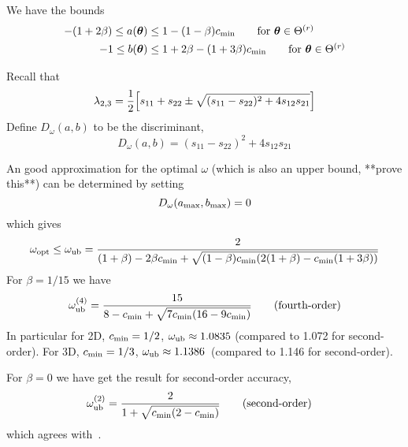 \documentclass[12pt]{article}
\begin{document}
We have the bounds
\begin{align*}
-(1+2\beta) \le a(\boldsymbol{\theta}) &\le 1 - (1-\beta)c_{\rm min}  \qquad\mbox{for $\boldsymbol{\theta}\in\Theta^{(r)}$} \\
-1 \le b(\boldsymbol{\theta}) &\le 1+2\beta - (1+3\beta)c_{\rm min}  \qquad\mbox{for $\boldsymbol{\theta}\in\Theta^{(r)}$} 
\end{align*}

Recall that 
\[
  \lambda_{2,3} = {1\over 2}\Big[ s_{11}+s_{22} \pm \sqrt{ (s_{11}-s_{22})^2 + 4 s_{12}s_{21} } \Big]
\]
Define $D_\omega (a,b)$ to be the discriminant,
\[
    D_\omega (a,b) = (s_{11}-s_{22})^2 + 4 s_{12}s_{21}
\]

An good approximation for the optimal $\omega$ (which is also an upper bound, **prove this**) 
can be determined by setting
\[
   D_\omega (a_{\rm max},b_{\rm max}) = 0 
\]
which gives
\begin{align*}
   \omega_{\rm opt} \le \omega_{\rm ub} 
     &= { 2 \over (1+\beta)-2\beta c_{\rm min}+\sqrt{ (1-\beta) c_{\rm min} (2(1+\beta)-c_{\rm min}(1+3\beta)) } } \\
\end{align*}
For $\beta=1/15$ we have
\begin{align*}
   \omega_{\rm ub}^{(4)}  &= {15 \over 8-c_{\rm min}+ \sqrt{ 7c_{\rm min}(16-9c_{\rm min}) } } \qquad\mbox{(fourth-order)}\\
\end{align*}
In particular for 2D, $c_{\rm min}=1/2$, $\omega_{\rm ub}\approx 1.0835$ (compared to 1.072 for second-order).
For 3D, $c_{\rm min}=1/3$, $\omega_{\rm ub}\approx 1.1386$~(compared to 1.146 for second-order).

For $\beta=0$ we have get the result for second-order accuracy,
\begin{align*}
   \omega_{\rm ub}^{(2)}  & = {2 \over 1 + \sqrt{ c_{\rm min}(2-c_{\rm min}) } } \qquad\mbox{(second-order)}
\end{align*}
which agrees with~\cite{Yavneh96}.
\end{document}
